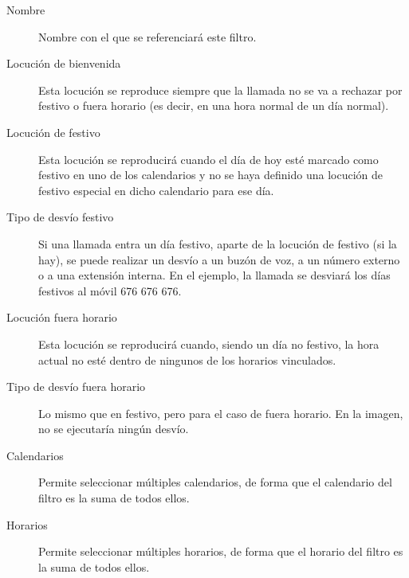 \documentclass[letterpaper,10pt,spanish]{sphinxmanual}
\begin{document}
\begin{description}
\item[{Nombre}] \leavevmode{}\label{pbx_features/external_filters:term-nombre}
Nombre con el que se referenciará este filtro.

\item[{Locución de bienvenida}] \leavevmode{}\label{pbx_features/external_filters:term-locucion-de-bienvenida}
Esta locución se reproduce siempre que la llamada no se va a rechazar por festivo o fuera horario (es decir, en una hora normal de un día normal).

\item[{Locución de festivo}] \leavevmode{}\label{pbx_features/external_filters:term-locucion-de-festivo}
Esta locución se reproducirá cuando el día de hoy esté marcado como festivo en uno de los calendarios y no se haya definido una locución de festivo especial en dicho calendario para ese día.

\item[{Tipo de desvío festivo}] \leavevmode{}\label{pbx_features/external_filters:term-tipo-de-desvio-festivo}
Si una llamada entra un día festivo, aparte de la locución de festivo (si la hay), se puede realizar un desvío a un buzón de voz, a un número externo o a una extensión interna. En el ejemplo, la llamada se desviará los días festivos al móvil 676 676 676.

\item[{Locución fuera horario}] \leavevmode{}\label{pbx_features/external_filters:term-locucion-fuera-horario}
Esta locución se reproducirá cuando, siendo un día no festivo, la hora actual no esté dentro de ningunos de los horarios vinculados.

\item[{Tipo de desvío fuera horario}] \leavevmode{}\label{pbx_features/external_filters:term-tipo-de-desvio-fuera-horario}
Lo mismo que en festivo, pero para el caso de fuera horario. En la imagen, no se ejecutaría ningún desvío.

\item[{Calendarios}] \leavevmode{}\label{pbx_features/external_filters:term-calendarios}
Permite seleccionar múltiples calendarios, de forma que el calendario del filtro es la suma de todos ellos.

\item[{Horarios}] \leavevmode{}\label{pbx_features/external_filters:term-horarios}
Permite seleccionar múltiples horarios, de forma que el horario del filtro es la suma de todos ellos.

\end{description}
\end{document}
